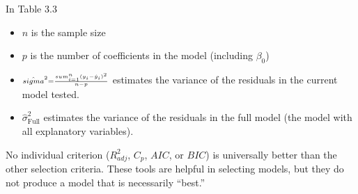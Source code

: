 \documentclass[
]{report}
\begin{document}
\begin{table}[!h]
\centering
\caption{\label{tab:table33}Variable selection criteria.}
\centering
{}
\end{table}

In Table 3.3
\vspace{-1em}

\begin{itemize}
\item $\scriptstyle n$ is the sample size 
\item $\scriptstyle p$ is the number of coefficients in the model (including $\scriptstyle \beta_0$)
\item $\scriptstyle \hat{\\sigma}^2 = \frac{\\sum_{i=1}^n (y_i - \hat{y}_i)^2}{n - p}$ estimates the variance of the residuals in the current model tested.
\item $\scriptstyle \hat{\sigma}_{\text{Full}}^2$ estimates the variance of the residuals in the full model (the model with all explanatory variables).
\end{itemize}

No individual criterion (\(\scriptstyle R^2_{adj}\), \(\scriptstyle C_p\), \(\scriptstyle AIC\), or \(\scriptstyle BIC\)) is universally better than the other selection criteria. These tools are helpful in selecting models, but they do not produce a model that is necessarily ``best.''
\end{document}
